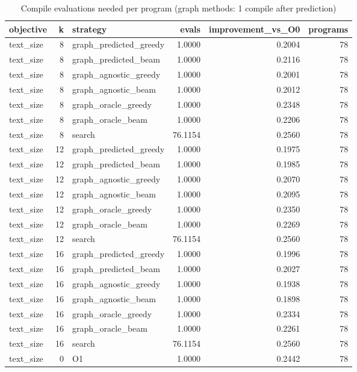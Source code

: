 \begin{table}[t]
\centering
\caption{Compile evaluations needed per program (graph methods: 1 compile after prediction)}
\label{tab:rq3-cost}
\begin{tabular}{lrlrrr}
\toprule
objective & k & strategy & evals & improvement\_vs\_O0 & programs \\
\midrule
text\_size & 8 & graph\_predicted\_greedy & 1.0000 & 0.2004 & 78 \\
text\_size & 8 & graph\_predicted\_beam & 1.0000 & 0.2116 & 78 \\
text\_size & 8 & graph\_agnostic\_greedy & 1.0000 & 0.2001 & 78 \\
text\_size & 8 & graph\_agnostic\_beam & 1.0000 & 0.2012 & 78 \\
text\_size & 8 & graph\_oracle\_greedy & 1.0000 & 0.2348 & 78 \\
text\_size & 8 & graph\_oracle\_beam & 1.0000 & 0.2206 & 78 \\
text\_size & 8 & search & 76.1154 & 0.2560 & 78 \\
text\_size & 12 & graph\_predicted\_greedy & 1.0000 & 0.1975 & 78 \\
text\_size & 12 & graph\_predicted\_beam & 1.0000 & 0.1985 & 78 \\
text\_size & 12 & graph\_agnostic\_greedy & 1.0000 & 0.2070 & 78 \\
text\_size & 12 & graph\_agnostic\_beam & 1.0000 & 0.2095 & 78 \\
text\_size & 12 & graph\_oracle\_greedy & 1.0000 & 0.2350 & 78 \\
text\_size & 12 & graph\_oracle\_beam & 1.0000 & 0.2269 & 78 \\
text\_size & 12 & search & 76.1154 & 0.2560 & 78 \\
text\_size & 16 & graph\_predicted\_greedy & 1.0000 & 0.1996 & 78 \\
text\_size & 16 & graph\_predicted\_beam & 1.0000 & 0.2027 & 78 \\
text\_size & 16 & graph\_agnostic\_greedy & 1.0000 & 0.1938 & 78 \\
text\_size & 16 & graph\_agnostic\_beam & 1.0000 & 0.1898 & 78 \\
text\_size & 16 & graph\_oracle\_greedy & 1.0000 & 0.2334 & 78 \\
text\_size & 16 & graph\_oracle\_beam & 1.0000 & 0.2261 & 78 \\
text\_size & 16 & search & 76.1154 & 0.2560 & 78 \\
text\_size & 0 & O1 & 1.0000 & 0.2442 & 78 \\

\end{tabular}
\end{table}
